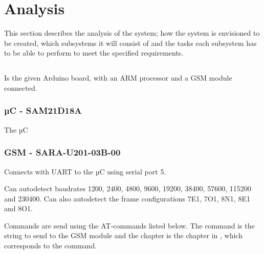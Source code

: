
\chapter{Analysis}

This section describes the analysis of the system; how the system is envisioned to be created, which subsystems it will consist of and the tasks each subsystem has to be able to perform to meet the specified requirements.

\section{\MKR}
Is the given Arduino board, with an ARM processor and a GSM module connected.

\subsection{µC - SAM21D18A}
The µC 

\subsection{GSM - SARA-U201-03B-00}
Connects with UART to the µC using serial port 5.

Can autodetect baudrates \num{1200}, \num{2400}, \num{4800}, \num{9600}, \num{19200}, \num{38400}, \num{57600}, \num{115200} and \num{230400}. Can also autodetect the frame configurations  7E1, 7O1, 8N1, 8E1 and 8O1.

Commands are send using the AT-commands listed below. The command is the string to send to the GSM module and the chapter is the chapter in \cite{ATcommands}, which corresponds to the command.

